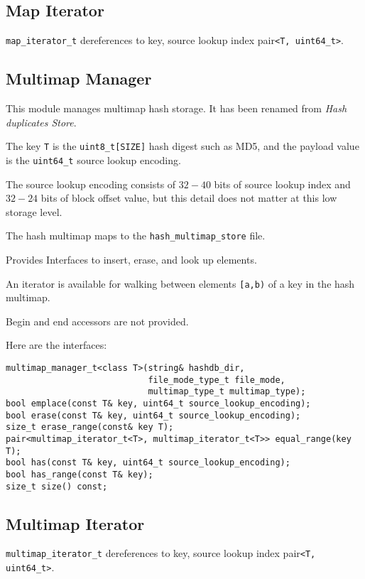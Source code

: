\documentclass[12pt,twoside]{article}
\begin{document}
\subsection{Map Iterator}
\texttt{map\_iterator\_t} dereferences to
key, source lookup index pair\texttt{<T, uint64\_t>}.

\subsection{Multimap Manager}
This module manages multimap hash storage.
It has been renamed from \textit{Hash duplicates Store}.
\begin{compactitem}
\item The key \texttt{T} is the \texttt{uint8\_t[SIZE]} hash digest such as MD5,
and the payload value is the \texttt{uint64\_t} source lookup encoding.
\item The source lookup encoding consists of $32-40$ bits
of source lookup index and $32-24$ bits of block offset value,
but this detail does not matter at this low storage level.
\item The hash multimap maps to the \texttt{hash\_multimap\_store} file.
\item Provides Interfaces to insert, erase, and look up elements.
\item An iterator is available for walking
between elements \texttt{[a,b)} of a key in the hash multimap.
\item Begin and end accessors are not provided.
\end{compactitem}

Here are the interfaces:
\begin{small}
\begin{verbatim}
multimap_manager_t<class T>(string& hashdb_dir,
                            file_mode_type_t file_mode,
                            multimap_type_t multimap_type);
bool emplace(const T& key, uint64_t source_lookup_encoding);
bool erase(const T& key, uint64_t source_lookup_encoding);
size_t erase_range(const& key T);
pair<multimap_iterator_t<T>, multimap_iterator_t<T>> equal_range(key T);
bool has(const T& key, uint64_t source_lookup_encoding);
bool has_range(const T& key);
size_t size() const;
\end{verbatim}
\end{small}

\subsection{Multimap Iterator}
\texttt{multimap\_iterator\_t} dereferences to
key, source lookup index pair\texttt{<T, uint64\_t>}.
\end{document}
